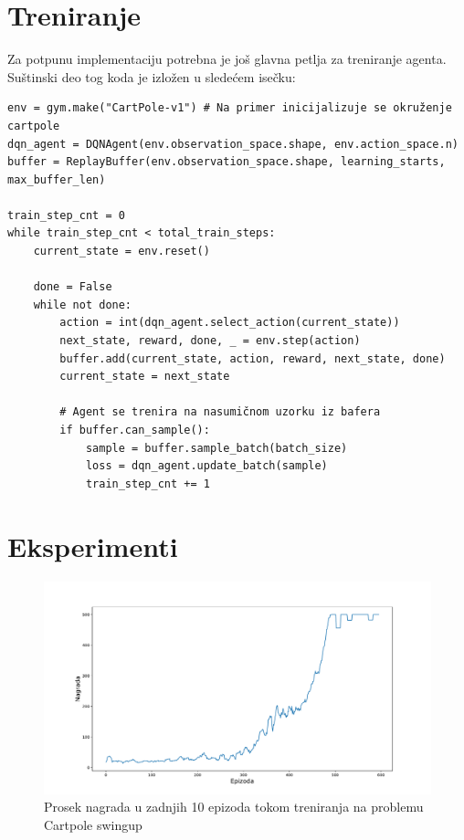 \documentclass[a4paper,fleqn,12pt]{JMThesis}
\newcommand{\latin}{\fontencoding{T1}\selectfont\selectlanguage{english}}
\theoremstyle{plain}
\theoremstyle{definition}
\theoremstyle{definition}
\begin{document}
\section{Treniranje}
Za potpunu implementaciju potrebna je još glavna petlja za treniranje agenta. Suštinski deo tog koda je izložen u sledećem isečku:
\begin{verbatim}
env = gym.make("CartPole-v1") # Na primer inicijalizuje se okruženje cartpole
dqn_agent = DQNAgent(env.observation_space.shape, env.action_space.n)
buffer = ReplayBuffer(env.observation_space.shape, learning_starts, max_buffer_len)

train_step_cnt = 0
while train_step_cnt < total_train_steps:
    current_state = env.reset()
    
    done = False
    while not done:
        action = int(dqn_agent.select_action(current_state))
        next_state, reward, done, _ = env.step(action)
        buffer.add(current_state, action, reward, next_state, done)
        current_state = next_state
        
        # Agent se trenira na nasumičnom uzorku iz bafera
        if buffer.can_sample():
            sample = buffer.sample_batch(batch_size)
            loss = dqn_agent.update_batch(sample)
            train_step_cnt += 1
\end{verbatim}
\section{Eksperimenti}
\begin{figure}[!ht]
	\centering
	\includegraphics[scale=0.4]{../graph-visuals/swingup-plot/plot.pdf}
	\caption{Prosek nagrada u zadnjih 10 epizoda tokom treniranja na problemu Cartpole swingup}
\end{figure}

\renewcommand\bibname{ Literatura}
\latin
\printbibliography[title=Literatura]
\medskip
\end{document}
